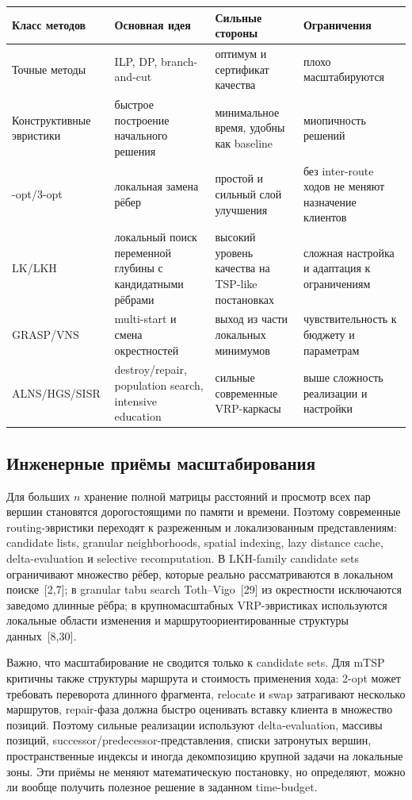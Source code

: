 \documentclass[14pt,a4paper]{extarticle}
\newcommand{\source}[1]{[#1]}
\begin{document}
\begin{longtable}{>{\raggedright\arraybackslash}p{}>{\raggedright\arraybackslash}p{}>{\raggedright\arraybackslash}p{}>{\raggedright\arraybackslash}p{}}
\toprule
\textbf{Класс методов} & \textbf{Основная идея} & \textbf{Сильные стороны} & \textbf{Ограничения}\\
\midrule
\endhead
Точные методы & ILP, DP, branch-and-cut & оптимум и сертификат качества & плохо масштабируются\\
Конструктивные эвристики & быстрое построение начального решения & минимальное время, удобны как baseline & миопичность решений\\
2-opt/3-opt & локальная замена рёбер & простой и сильный слой улучшения & без inter-route ходов не меняют назначение клиентов\\
LK/LKH & локальный поиск переменной глубины с кандидатными рёбрами & высокий уровень качества на TSP-like постановках & сложная настройка и адаптация к ограничениям\\
GRASP/VNS & multi-start и смена окрестностей & выход из части локальных минимумов & чувствительность к бюджету и параметрам\\
ALNS/HGS/SISR & destroy/repair, population search, intensive education & сильные современные VRP-каркасы & выше сложность реализации и настройки\\
\bottomrule
\end{longtable}

\subsection{Инженерные приёмы масштабирования}

Для больших $n$ хранение полной матрицы расстояний и просмотр всех пар вершин становятся дорогостоящими по памяти и времени. Поэтому современные routing-эвристики переходят к разреженным и локализованным представлениям: candidate lists, granular neighborhoods, spatial indexing, lazy distance cache, delta-evaluation и selective recomputation. В LKH-family candidate sets ограничивают множество рёбер, которые реально рассматриваются в локальном поиске~\source{2,7}; в granular tabu search Toth--Vigo~\source{29} из окрестности исключаются заведомо длинные рёбра; в крупномасштабных VRP-эвристиках используются локальные области изменения и маршрутоориентированные структуры данных~\source{8,30}.

Важно, что масштабирование не сводится только к candidate sets. Для mTSP критичны также структуры маршрута и стоимость применения хода: 2-opt может требовать переворота длинного фрагмента, relocate и swap затрагивают несколько маршрутов, repair-фаза должна быстро оценивать вставку клиента в множество позиций. Поэтому сильные реализации используют delta-evaluation, массивы позиций, successor/predecessor-представления, списки затронутых вершин, пространственные индексы и иногда декомпозицию крупной задачи на локальные зоны. Эти приёмы не меняют математическую постановку, но определяют, можно ли вообще получить полезное решение в заданном time-budget.
\end{document}
